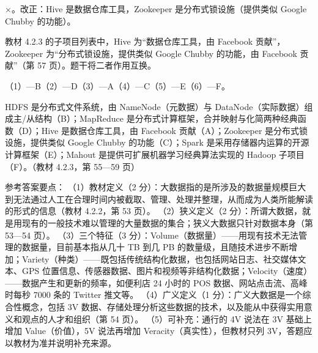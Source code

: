 \documentclass[a4paper,11pt]{article}
\begin{document}
\q ×。改正：Hive 是数据仓库工具，Zookeeper 是分布式锁设施（提供类似 Google Chubby 的功能）。\begin{analysis}教材 4.2.3 的子项目列表中，Hive 为“数据仓库工具，由 Facebook 贡献”，Zookeeper 为“分布式锁设施，提供类似 Google Chubby 的功能，由 Facebook 贡献”（第 57 页）。题干将二者作用互换。\end{analysis}


\q （1）—B\quad （2）—D\quad （3）—A\quad （4）—C\quad （5）—E\quad （6）—F。
\begin{analysis}HDFS 是分布式文件系统，由 NameNode（元数据）与 DataNode（实际数据）组成主/从结构（B）；MapReduce 是分布式计算框架，合并映射与化简两种经典函数（D）；Hive 是数据仓库工具，由 Facebook 贡献（A）；Zookeeper 是分布式锁设施，提供类似 Google Chubby 的功能（C）；Spark 是采用存储器内运算的开源计算框架（E）；Mahout 是提供可扩展机器学习经典算法实现的 Hadoop 子项目（F）。（教材 4.2.3，第 55—59 页）\end{analysis}


\q 参考答案要点：
（1）教材定义（2 分）：大数据指的是所涉及的数据量规模巨大到无法通过人工在合理时间内被截取、管理、处理并整理，从而成为人类所能解读的形式的信息（教材 4.2.2，第 53 页）。
（2）狭义定义（2 分）：所谓大数据，就是用现有的一般技术难以管理的大量数据的集合；狭义大数据只针对数据本身（第 53—54 页）。
（3）三个特征（3 分）：Volume（数据量）——用现有技术无法管理的数据量，目前基本指从几十 TB 到几 PB 的数量级，且随技术进步不断增加；Variety（种类）——既包括传统结构化数据，也包括网站日志、社交媒体文本、GPS 位置信息、传感器数据、图片和视频等非结构化数据；Velocity（速度）——数据产生和更新的频率，如便利店 24 小时的 POS 数据、网站点击流、高峰时每秒 7000 条的 Twitter 推文等。
（4）广义定义（1 分）：广义大数据是一个综合性概念，包括 3V 数据、存储处理分析这些数据的技术，以及能从中获得实用意义和观点的人才和组织（第 54 页）。
（5）可补充：通行的 4V 说法在 3V 基础上增加 Value（价值），5V 说法再增加 Veracity（真实性），但教材只列 3V，答题应以教材为准并说明补充来源。
\end{document}
